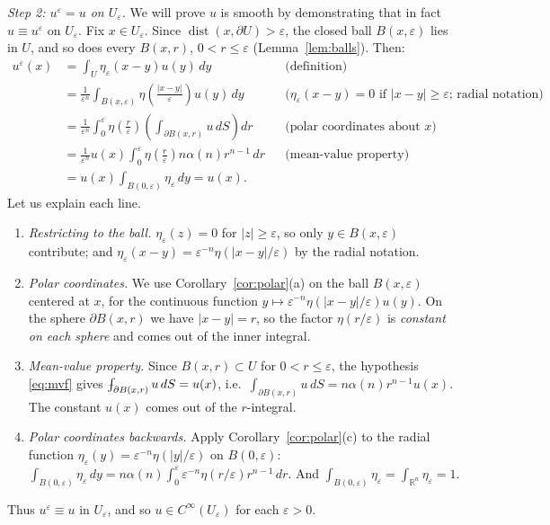 \documentclass[11pt]{article}
\def\Xint#1{\mathchoice
  {\XXint\displaystyle\textstyle{#1}}%
  {\XXint\textstyle\scriptstyle{#1}}%
  {\XXint\scriptstyle\scriptscriptstyle{#1}}%
  {\XXint\scriptscriptstyle\scriptscriptstyle{#1}}%
  \!\int}
\def\XXint#1#2#3{{\setbox0=\hbox{$#1{#2#3}{\int}$}
  \vcenter{\hbox{$#2#3$}}\kern-.5\wd0}}
\def\fint{\Xint-}
\theoremstyle{plain}
\theoremstyle{definition}
\theoremstyle{remark}
\begin{document}
\emph{Step 2: $u^\varepsilon = u$ on $U_\varepsilon$.} We will prove $u$ is smooth by demonstrating that in fact $u \equiv u^\varepsilon$ on $U_\varepsilon$. Fix $x \in U_\varepsilon$. Since $\operatorname{dist}(x,\partial U) > \varepsilon$, the closed ball $B(x,\varepsilon)$ lies in $U$, and so does every $B(x,r)$, $0 < r \le \varepsilon$ (Lemma~\ref{lem:balls}). Then:
\begin{align*}
u^\varepsilon(x) &= \int_U \eta_\varepsilon(x-y) u(y)\, dy && \text{(definition)} \\
&= \frac{1}{\varepsilon^n}\int_{B(x,\varepsilon)} \eta\left(\frac{|x-y|}{\varepsilon}\right) u(y)\, dy && \text{(}\eta_\varepsilon(x-y) = 0 \text{ if } |x - y| \geq \varepsilon\text{; radial notation)} \\
&= \frac{1}{\varepsilon^n}\int_0^\varepsilon \eta\left(\frac{r}{\varepsilon}\right)\left( \int_{\partial B(x,r)} u\, dS \right) dr && \text{(polar coordinates about } x\text{)} \\
&= \frac{1}{\varepsilon^n} u(x)\int_0^\varepsilon \eta\left(\frac{r}{\varepsilon}\right) n\alpha(n) r^{n-1}\, dr && \text{(mean-value property)} \\
&= u(x)\int_{B(0,\varepsilon)} \eta_\varepsilon\, dy = u(x). &&
\end{align*}
Let us explain each line.
\begin{enumerate}
    \item[(1)] \emph{Restricting to the ball.} $\eta_\varepsilon(z) = 0$ for $|z| \geq \varepsilon$, so only $y \in B(x,\varepsilon)$ contribute; and $\eta_\varepsilon(x - y) = \varepsilon^{-n}\eta(|x-y|/\varepsilon)$ by the radial notation.
    \item[(2)] \emph{Polar coordinates.} We use Corollary~\ref{cor:polar}(a) on the ball $B(x,\varepsilon)$ centered at $x$, for the continuous function $y \mapsto \varepsilon^{-n}\eta(|x-y|/\varepsilon)u(y)$. On the sphere $\partial B(x,r)$ we have $|x - y| = r$, so the factor $\eta(r/\varepsilon)$ is \emph{constant on each sphere} and comes out of the inner integral.
    \item[(3)] \emph{Mean-value property.} Since $B(x,r) \subset U$ for $0 < r \leq \varepsilon$, the hypothesis \eqref{eq:mvf} gives $\fint_{\partial B(x,r)} u\, dS = u(x)$, i.e.\ $\int_{\partial B(x,r)} u\, dS = n\alpha(n)r^{n-1}u(x)$. The constant $u(x)$ comes out of the $r$-integral.
    \item[(4)] \emph{Polar coordinates backwards.} Apply Corollary~\ref{cor:polar}(c) to the radial function $\eta_\varepsilon(y) = \varepsilon^{-n}\eta(|y|/\varepsilon)$ on $B(0,\varepsilon)$: $\int_{B(0,\varepsilon)}\eta_\varepsilon\, dy = n\alpha(n)\int_0^\varepsilon \varepsilon^{-n}\eta(r/\varepsilon) r^{n-1}\, dr$. And $\int_{B(0,\varepsilon)}\eta_\varepsilon = \int_{\mathbb{R}^n}\eta_\varepsilon = 1$.
\end{enumerate}
Thus $u^\varepsilon \equiv u$ in $U_\varepsilon$, and so $u \in C^\infty(U_\varepsilon)$ for each $\varepsilon > 0$.
\end{document}
